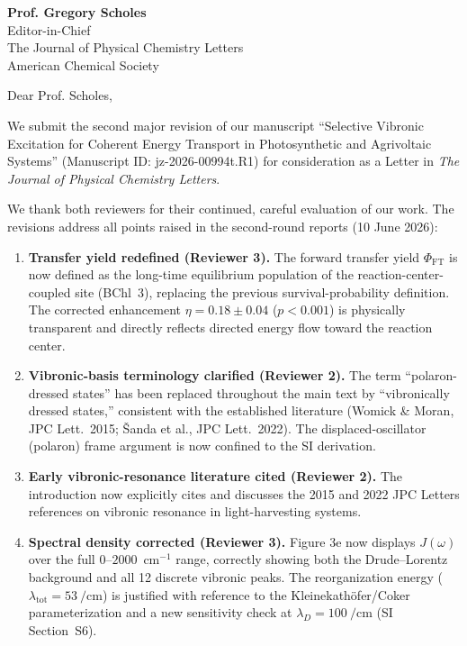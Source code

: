 \documentclass[11pt,a4paper]{letter}
\begin{document}
\begin{letter}{
\textbf{Prof. Gregory Scholes}\\
Editor-in-Chief\\
The Journal of Physical Chemistry Letters\\
American Chemical Society
}

\opening{Dear Prof. Scholes,}

We submit the second major revision of our manuscript ``Selective Vibronic Excitation for Coherent Energy Transport in Photosynthetic and Agrivoltaic Systems'' (Manuscript ID: jz-2026-00994t.R1) for consideration as a Letter in \textit{The Journal of Physical Chemistry Letters}.

We thank both reviewers for their continued, careful evaluation of our work. The revisions address all points raised in the second-round reports (10 June 2026):

\begin{enumerate}
\item \textbf{Transfer yield redefined (Reviewer 3).} The forward transfer yield $\Phi_{\mathrm{FT}}$ is now defined as the long-time equilibrium population of the reaction-center-coupled site (BChl~3), replacing the previous survival-probability definition. The corrected enhancement $\eta = 0.18 \pm 0.04$ ($p < 0.001$) is physically transparent and directly reflects directed energy flow toward the reaction center.

\item \textbf{Vibronic-basis terminology clarified (Reviewer 2).} The term ``polaron-dressed states'' has been replaced throughout the main text by ``vibronically dressed states,'' consistent with the established literature (Womick \& Moran, JPC Lett.\ 2015; \v{S}anda et al., JPC Lett.\ 2022). The displaced-oscillator (polaron) frame argument is now confined to the SI derivation.

\item \textbf{Early vibronic-resonance literature cited (Reviewer 2).} The introduction now explicitly cites and discusses the 2015 and 2022 JPC Letters references on vibronic resonance in light-harvesting systems.

\item \textbf{Spectral density corrected (Reviewer 3).} Figure 3e now displays $J(\omega)$ over the full $0$--$2000$~cm$^{-1}$ range, correctly showing both the Drude--Lorentz background and all 12 discrete vibronic peaks. The reorganization energy ($\lambda_{\mathrm{tot}} = \SI{53}{\per\centi\meter}$) is justified with reference to the Kleinekath\"ofer/Coker parameterization and a new sensitivity check at $\lambda_D = \SI{100}{\per\centi\meter}$ (SI Section~S6).


\end{enumerate}
\end{letter}
\end{document}
